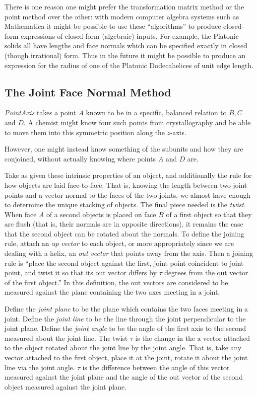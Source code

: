 \documentclass[mathematics,article,submit,pdftex,moreauthors]{Definitions/mdpi}
\begin{document}
There is one reason one might prefer the transformation matrix method or the point method over the other: with modern
computer algebra systems such as Mathematica \cite{Mathematica} it might be possible to use these ``algorithms'' to produce closed-form
expressions of closed-form (algebraic) inputs. For example, the Platonic solids all have lengths and face normals which
can be specified exactly in closed (though irrational) form.
Thus in the future it might be possible to produce an expression for the
radius of one of the Platonic Dodecahelices of unit edge length.


\subsection{The Joint Face Normal Method}
\label{sec:facenormal}

{\em PointAxis} takes a point $A$ known to be in a specific, balanced relation
to $B, C$ and $D$. A chemist might know four such points from crystallography
and be able to move them into this symmetric position along the $z$-axis.

However, one might instead know something of the subunits and
how they are conjoined, without actually knowing where points $A$
and $D$ are.

Take as given these intrinsic properties of an object, and additionally the
rule for how objects are laid face-to-face. That is, knowing the length between two
joint points and a vector normal to the faces of the two joints, we almost have
enough to determine the unique stacking of objects. The final piece
needed is
the {\em twist}. When face $A$ of a second objects is placed on face $B$
of a first object so that they are flush (that is, their normals are in opposite directions),
it remains the case that the second object can be rotated about the normals. To
define the joining rule, attach an {\em up vector} to each object, or more appropriately
since we are dealing with a helix, an {\em out vector} that points away from the axis.
Then a joining
rule is ``place the second object against the first, joint point coincident to joint point,
and twist it so that its out vector differs by $\tau$ degrees from the out vector of the first
object.'' In this definition, the out vectors are considered to be measured against the plane
containing the two axes meeting in a joint.

Define the {\em joint plane} to be the plane which contains the two faces meeting in a joint.
Define the {\em joint line} to be the line through the joint perpendicular to the joint plane.
Define the {\em joint angle} to be the angle of the first axis to the second measured about
the joint line.
The twist $\tau$ is the change in the a vector attached to the object rotated about the joint
line by the joint angle. That is, take any vector attached to the first object, place it at
the joint, rotate it about the joint line via the joint angle. $\tau$ is the difference
between the angle of this vector measured against the joint plane and the angle of the
out vector of the second object measured against the joint plane.
\end{document}
